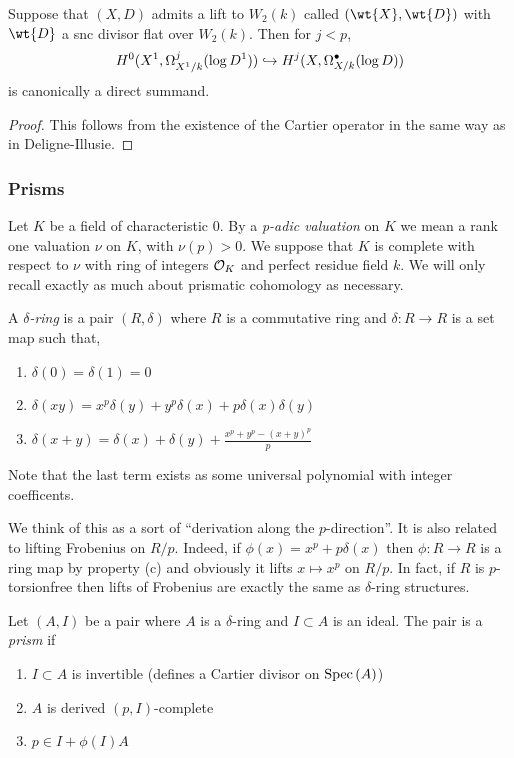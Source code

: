 \documentclass[12pt]{article}
\begin{document}
\begin{lemma}
Suppose that $(X, D)$ admits a lift to $W_2(k)$ called $(\wt{X}, \wt{D})$ with $\wt{D}$ a snc divisor flat over $W_2(k)$. Then for $j < p$,
\[ H^0(X^1, \Omega^j_{X^1/k}(\log{D^1})) \hookrightarrow H^j(X, \Omega^\bullet_{X/k}(\log{D})) \]
is canonically a direct summand. 
\end{lemma}

\begin{proof}
This follows from the existence of the Cartier operator in the same way as in Deligne-Illusie.
\end{proof}

\subsubsection{Prisms}

Let $K$ be a field of characteristic $0$. By a \textit{p-adic valuation} on $K$ we mean a rank one valuation $\nu$ on $K$, with $\nu(p) > 0$. We suppose that $K$ is complete with respect to $\nu$ with ring of integers $\mathcal{O}_K$ and perfect residue field $k$. We will only recall exactly as much about prismatic cohomology as necessary.

\begin{defn}
A $\delta$\textit{-ring} is a pair $(R, \delta)$ where $R$ is a commutative ring and $\delta : R \to R$ is a set map such that,
\begin{enumerate}
\item $\delta(0) = \delta(1) = 0$
\item $\delta(xy) = x^p \delta(y) + y^p \delta(x) + p \delta(x) \delta(y)$
\item $\delta(x + y) = \delta(x) + \delta(y) + \frac{x^p + y^p - (x+y)^p}{p}$
\end{enumerate}
Note that the last term exists as some universal polynomial with integer coefficents. 
\end{defn}

We think of this as a sort of ``derivation along the $p$-direction''. It is also related to lifting Frobenius on $R / p$. Indeed, if $\phi(x) = x^p + p \delta(x)$ then $\phi : R \to R$ is a ring map by property (c) and obviously it lifts $x \mapsto x^p$ on $R / p$. In fact, if $R$ is $p$-torsionfree then lifts of Frobenius are exactly the same as $\delta$-ring structures.

\begin{defn}
Let $(A, I)$ be a pair where $A$ is a $\delta$-ring and $I \subset A$ is an ideal. The pair is a \textit{prism} if
\begin{enumerate}
\item  $I \subset A$ is invertible (defines a Cartier divisor on $\mathrm{Spec}\left( A \right)$) 
\item $A$ is derived $(p,I)$-complete
\item $p \in I + \phi(I) A$
\end{enumerate}
\end{defn}
\end{document}
